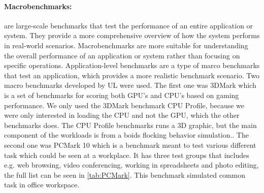 \paragraph{Macrobenchmarks:} are large-scale benchmarks that test the performance of an entire application or system. They provide a more comprehensive overview of how the system performs in real-world scenarios. Macrobenchmarks are more suitable for understanding the overall performance of an application or system rather than focusing on specific operations.\cite{MicroVSMacro} Application-level benchmarks are a type of marco benchmarks that test an application, which provides a more realistic benchmark scenario. Two macro benchmarks developed by UL were used. The first one was 3DMark which is a set of benchmarks for scoring both GPU's and CPU's based on gaming performance. We only used the 3DMark benchmark CPU Profile, because we were only interested in loading the CPU and not the GPU, which the other benchmarks does. The CPU Profile benchmarks runs a 3D graphic, but the main component of the workloads is from a boids flocking behavior simulation.\cite{3dmark}. The second one was PCMark 10 which is a benchmark meant to test various different task which could be seen at a workplace. It has three test groups that includes e.g. web browsing, video conferencing, working in spreadsheets and photo editing, the full list can be seen in \cref{tab:PCMark}. This benchmark simulated common task in office workspace.\cite{pcmark}